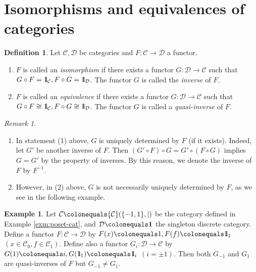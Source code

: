 \documentclass{surv-l}
\numberwithin{equation}{chapter}
\numberwithin{figure}{chapter}
\theoremstyle{plain}
\theoremstyle{definition}
\newtheorem{dfn}[thm]{Definition}
\newtheorem{exm}[thm]{Example}
\theoremstyle{remark}
\newtheorem{rmk}[thm]{Remark}
\newcommand{\id}{1\kern-.25em{\text{{\rm l}}}}
\begin{document}
\section{Isomorphisms and equivalences of categories}

\begin{dfn}
Let ${\mathcal{C}}, {\mathcal{D}}$ be categories and $F \colon {\mathcal{C}} \to {\mathcal{D}}$ a functor.
\begin{enumerate}
\item
$F$ is called an \emph{isomorphism} if there exists a functor $G\colon {\mathcal{D}} \to {\mathcal{C}}$
such that
$G \circ F = \id_{\mathcal{C}}, F \circ G = \id_{\mathcal{D}}$.
The functor $G$ is called the \emph{inverse} of $F$.
\item
$F$ is called an \emph{equivalence} if there exists a functor $G\colon {\mathcal{D}} \to {\mathcal{C}}$
such that
$G \circ F \cong \id_{\mathcal{C}}, F \circ G \cong \id_{\mathcal{D}}$.
The functor $G$ is called a \emph{quasi-inverse} of $F$.
\end{enumerate}
\end{dfn}

\begin{rmk}\leavevmode
\begin{enumerate}
\item In statement (1) above, $G$ is uniquely determined by $F$ (if it exists).
Indeed, let $G'$ be another inverse of $F$.
Then $(G' \circ F) \circ G = G' \circ (F \circ G)$ implies $G = G'$ by the property of inverses.
By this reason, we denote the inverse of $F$ by $F^{-1}$.
\item
However, in (2) above, $G$ is not necessarily uniquely determined by $F$, as we see in the following example.

\end{enumerate}
\end{rmk}

\begin{exm}
Let ${\mathcal{C}}\colonequals  {\mathcal{C}}(\{-1, 1\}, |)$ be the category defined in Example \ref{exm:poset-cat},
and ${\mathcal{D}}\colonequals  \mathbf{1}$ the singleton discrete category.
Define a functor $F \colon {\mathcal{C}} \to {\mathcal{D}}$ by $F(x)\colonequals  1, F(f)\colonequals  \id_1$ $(x \in {\mathcal{C}}_0, f \in {\mathcal{C}}_1)$.
Define also a functor $G_i \colon {\mathcal{D}} \to {\mathcal{C}}$ by
$G(1)\colonequals  i, G(\id_1)\colonequals  \id_i$ $(i = \pm 1)$.
Then both $G_{-1}$ and $G_1$ are quasi-inverses of $F$ but $G_{-1} \ne G_1$.
\end{exm}
\end{document}
